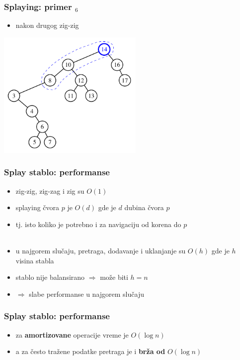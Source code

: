 \documentclass[compress,aspectratio=169]{beamer}
\begin{document}
\begin{frame}[fragile]
  \frametitle{Splaying: primer $_6$}
  \begin{itemize}
    \item nakon drugog zig-zig
  \end{itemize}
  \begin{center}
    \includegraphics[width=7cm]{asp-11-pic26.pdf}
  \end{center}
\end{frame}

\begin{frame}[fragile]
  \frametitle{Splay stablo: performanse}
  \begin{itemize}
    \item zig-zig, zig-zag i zig su $O(1)$
    \item splaying čvora $p$ je $O(d)$ gde je $d$ dubina čvora $p$
    \item tj. isto koliko je potrebno i za navigaciju od korena do $p$ \\ \ \\
    \item u najgorem slučaju, pretraga, dodavanje i uklanjanje su $O(h)$ gde je $h$ visina stabla
    \item stablo nije balansirano $\Rightarrow$ može biti $h=n$
    \item $\Rightarrow$ slabe performanse u najgorem slučaju
  \end{itemize}
\end{frame}

\begin{frame}[fragile]
  \frametitle{Splay stablo: performanse}
  \begin{itemize}
    \item za \textbf{amortizovane} operacije vreme je $O(\log n)$
    \item a za često tražene podatke pretraga je i \textbf{brža od} $O(\log n)$
  \end{itemize}
\end{frame}
\end{document}
